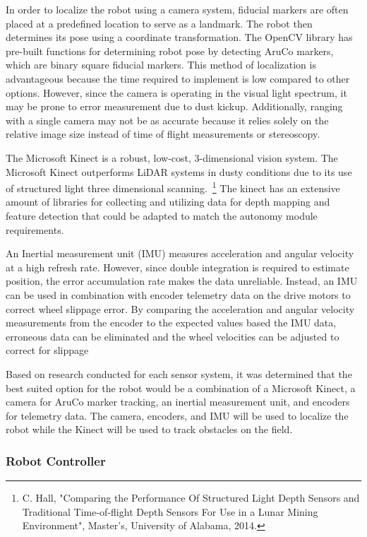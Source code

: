 \documentclass[class=article, crop=false]{standalone}
\begin{document}
	In order to localize the robot using a camera system, fiducial markers are often placed at a predefined location to serve as a landmark. The robot then determines its pose using a coordinate transformation. The OpenCV library has pre-built functions for determining robot pose by detecting AruCo markers, which are binary square fiducial markers. This method of localization is advantageous because the time required to implement is low compared to other options. However, since the camera is operating in the visual light spectrum, it may be prone to error measurement due to dust kickup. Additionally, ranging with a single camera may not be as accurate because it relies solely on the relative image size instead of time of flight measurements or stereoscopy.
	
	The Microsoft Kinect is a robust, low-cost, 3-dimensional vision system. The Microsoft Kinect outperforms LiDAR systems in dusty conditions due to its use of structured light three dimensional scanning.~\footnote{C. Hall, "Comparing the Performance Of Structured Light Depth Sensors and Traditional Time-of-flight Depth Sensors For Use in a Lunar Mining Environment", Master's, University of Alabama, 2014.} The kinect has an extensive amount of libraries for collecting and utilizing data for depth mapping and feature detection that could be adapted to match the autonomy module requirements. 
	
	An Inertial measurement unit (IMU) measures acceleration and angular velocity at a high refresh rate. However, since double integration is required to estimate position, the error accumulation rate makes the data unreliable. Instead, an IMU can be used in combination with encoder telemetry data on the drive motors to correct wheel slippage error. By comparing the acceleration and angular velocity measurements from the encoder to the expected values based the IMU data, erroneous data can be eliminated and the wheel velocities can be adjusted to correct for slippage
	
	Based on research conducted for each sensor system, it was determined that the best suited option for the robot would be a combination of a Microsoft Kinect, a camera for AruCo marker tracking, an inertial measurement unit, and encoders for telemetry data. The camera, encoders, and IMU will be used to localize the robot while the Kinect will  be used to track obstacles on the field.
	
	\subsubsection{Robot Controller}
	
\end{document}
